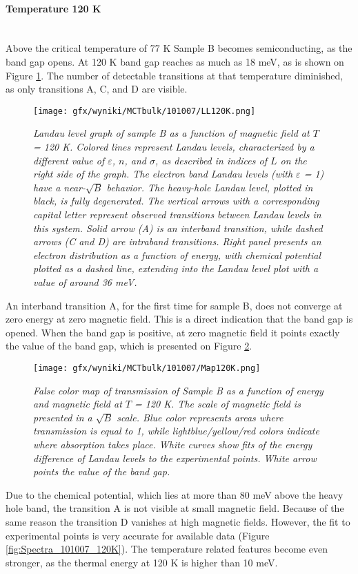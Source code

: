 \documentclass[titlepage,a4paper]{book}
\newcommand{\wciecie}{\quad\phantom{v}}
\newcommand{\myparagraph}[1]{\paragraph{#1}\mbox{}\\}
\begin{document}
\clearpage
\myparagraph{Temperature 120 K}
\wciecie
Above the critical temperature of 77 K Sample B becomes semiconducting, as the band gap opens. At 120 K band gap reaches as much as 18 meV, as is shown on Figure \ref{fig:LL_101007_120K}. The number of detectable transitions at that temperature diminished, as only transitions A, C, and D are visible.  
\begin{figure}[ht]
	\centering
	\texttt{[image: gfx/wyniki/MCTbulk/101007/LL120K.png]}
	\vspace{-10pt}
	\caption{\textit{Landau level graph of sample B as a function of magnetic field at $T$ = 120 K. Colored lines represent Landau levels, characterized by a different value of $\varepsilon$, $n$, and $\sigma$, as described in indices of $L$ on the right side of the graph. The electron band Landau levels (with $\varepsilon$ = 1) have a near-$\sqrt{B}$ behavior. The heavy-hole Landau level, plotted in black, is fully degenerated. The vertical arrows with a corresponding capital letter represent observed transitions between Landau levels in this system. Solid arrow (A) is an interband transition, while dashed arrows (C and D) are intraband transitions. Right panel presents an electron distribution as a function of energy, with chemical potential plotted as a dashed line, extending into the Landau level plot with a value of around 36 meV.}}
	\label{fig:LL_101007_120K}
\end{figure}

An interband transition A, for the first time for sample B, does not converge at zero energy at zero magnetic field. This is a direct indication that the band gap is opened. When the band gap is positive, at zero magnetic field it points exactly the value of the band gap, which is presented on Figure \ref{fig:Map_101007_120K}. 
\begin{figure}[ht]
	\centering
	\texttt{[image: gfx/wyniki/MCTbulk/101007/Map120K.png]}
	\vspace{-10pt}
	\caption{\textit{False color map of transmission of Sample B as a function of energy and magnetic field at $T$ = 120 K. The scale of magnetic field is presented in a $\sqrt{B}$ scale. Blue color represents areas where transmission is equal to 1, while lightblue/yellow/red colors indicate where absorption takes place. White curves show fits of the energy difference of Landau levels to the experimental points. White arrow points the value of the band gap.}}
	\label{fig:Map_101007_120K}
\end{figure} 
Due to the chemical potential, which lies at more than 80 meV above the heavy hole band, the transition A is not visible at small magnetic field. Because of the same reason the transition D vanishes at high magnetic fields. However, the fit to experimental points is very accurate for available data (Figure \ref{fig:Spectra_101007_120K}). The temperature related features become even stronger, as the thermal energy at 120 K is higher than 10 meV.
\end{document}
